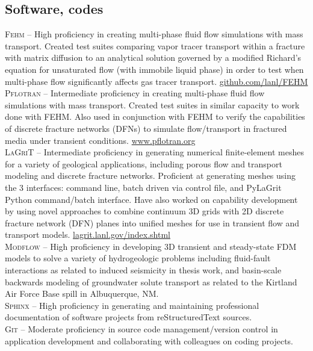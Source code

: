 \documentclass[11pt, letterpaper]{article}
\begin{document}
\subsection*{Software, codes}
\noindent
\textsc{Fehm} – High proficiency in creating multi-phase fluid flow simulations with mass transport. Created test suites comparing vapor tracer transport within a fracture with matrix diffusion to an analytical solution governed by a modified Richard’s equation for unsaturated flow (with immobile liquid phase) in order to test when multi-phase flow significantly affects gas tracer transport. \href{https://github.com/lanl/FEHM}{github.com/lanl/FEHM} \\[5pt]
\textsc{Pflotran} – Intermediate proficiency in creating multi-phase fluid flow simulations with mass transport. Created test suites in similar capacity to work done with FEHM. Also used in conjunction with FEHM to verify the capabilities of discrete fracture networks (DFNs) to simulate flow/transport in fractured media under transient conditions. \href{https://www.pflotran.org}{www.pflotran.org} \\[5pt]
\textsc{LaGriT} – Intermediate proficiency in generating numerical finite-element meshes for a variety of geological applications, including porous flow and transport modeling and discrete fracture networks. Proficient at generating meshes using the 3 interfaces: command line, batch driven via control file, and PyLaGrit Python command/batch interface. Have also worked on capability development by using novel approaches to combine continuum 3D grids with 2D discrete fracture network (DFN) planes into unified meshes for use in transient flow and transport models. \href{https://lagrit.lanl.gov/index.shtml}{lagrit.lanl.gov/index.shtml} \\[5pt]
\textsc{Modflow} – High proficiency in developing 3D transient and steady-state FDM models to solve a variety of hydrogeologic problems including fluid-fault interactions as related to induced seismicity in thesis work, and basin-scale backwards modeling of groundwater solute transport as related to the Kirtland Air Force Base spill in Albuquerque, NM.\\[5pt]
\textsc{Sphinx} – High proficiency in generating and maintaining professional documentation of software projects from reStructuredText sources.\\[5pt]
\textsc{Git} – Moderate proficiency in source code management/version control in application development and collaborating with colleagues on coding projects.\\[5pt]
\end{document}
